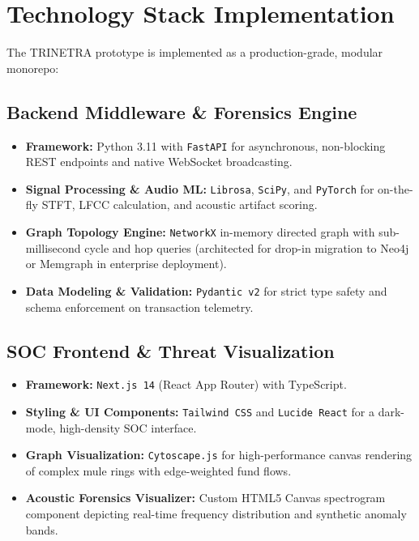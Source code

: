 \documentclass[10pt,journal,compsoc]{IEEEtran}
\begin{document}
\section{Technology Stack Implementation}
\label{sec:tech_stack}

The TRINETRA prototype is implemented as a production-grade, modular monorepo:

\subsection{Backend Middleware \& Forensics Engine}
\begin{itemize}
    \item \textbf{Framework:} Python 3.11 with \texttt{FastAPI} for asynchronous, non-blocking REST endpoints and native WebSocket broadcasting.
    \item \textbf{Signal Processing \& Audio ML:} \texttt{Librosa}, \texttt{SciPy}, and \texttt{PyTorch} for on-the-fly STFT, LFCC calculation, and acoustic artifact scoring.
    \item \textbf{Graph Topology Engine:} \texttt{NetworkX} in-memory directed graph with sub-millisecond cycle and hop queries (architected for drop-in migration to Neo4j or Memgraph in enterprise deployment).
    \item \textbf{Data Modeling \& Validation:} \texttt{Pydantic v2} for strict type safety and schema enforcement on transaction telemetry.
\end{itemize}

\subsection{SOC Frontend \& Threat Visualization}
\begin{itemize}
    \item \textbf{Framework:} \texttt{Next.js 14} (React App Router) with TypeScript.
    \item \textbf{Styling \& UI Components:} \texttt{Tailwind CSS} and \texttt{Lucide React} for a dark-mode, high-density SOC interface.
    \item \textbf{Graph Visualization:} \texttt{Cytoscape.js} for high-performance canvas rendering of complex mule rings with edge-weighted fund flows.
    \item \textbf{Acoustic Forensics Visualizer:} Custom HTML5 Canvas spectrogram component depicting real-time frequency distribution and synthetic anomaly bands.
\end{itemize}
\end{document}
